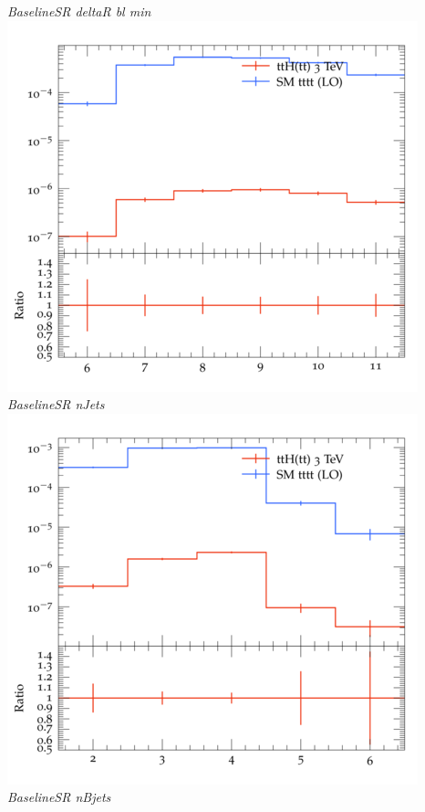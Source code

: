 \documentclass{beamer}
\begin{document}
\begin{frame}
\begin{columns}
\textit{\small BaselineSR deltaR bl min}
\includegraphics[width=\textwidth]{../plots/ttH_3000/tttt_ttH_1LOS/BaselineSR_nJets.png}\\
\textit{\small BaselineSR nJets}
\includegraphics[width=\textwidth]{../plots/ttH_3000/tttt_ttH_1LOS/BaselineSR_nBjets.png}\\
\textit{\small BaselineSR nBjets}
\end{columns}
\end{frame}
\end{document}
